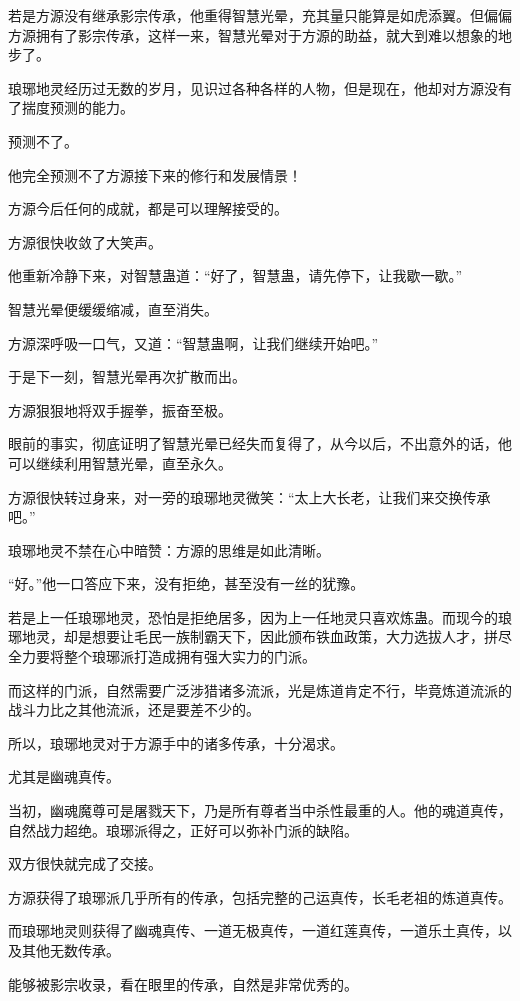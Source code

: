 \begin{this_body}
若是方源没有继承影宗传承，他重得智慧光晕，充其量只能算是如虎添翼。但偏偏方源拥有了影宗传承，这样一来，智慧光晕对于方源的助益，就大到难以想象的地步了。

琅琊地灵经历过无数的岁月，见识过各种各样的人物，但是现在，他却对方源没有了揣度预测的能力。

预测不了。

他完全预测不了方源接下来的修行和发展情景！

方源今后任何的成就，都是可以理解接受的。

方源很快收敛了大笑声。

他重新冷静下来，对智慧蛊道：“好了，智慧蛊，请先停下，让我歇一歇。”

智慧光晕便缓缓缩减，直至消失。

方源深呼吸一口气，又道：“智慧蛊啊，让我们继续开始吧。”

于是下一刻，智慧光晕再次扩散而出。

方源狠狠地将双手握拳，振奋至极。

眼前的事实，彻底证明了智慧光晕已经失而复得了，从今以后，不出意外的话，他可以继续利用智慧光晕，直至永久。

方源很快转过身来，对一旁的琅琊地灵微笑：“太上大长老，让我们来交换传承吧。”

琅琊地灵不禁在心中暗赞：方源的思维是如此清晰。

“好。”他一口答应下来，没有拒绝，甚至没有一丝的犹豫。

若是上一任琅琊地灵，恐怕是拒绝居多，因为上一任地灵只喜欢炼蛊。而现今的琅琊地灵，却是想要让毛民一族制霸天下，因此颁布铁血政策，大力选拔人才，拼尽全力要将整个琅琊派打造成拥有强大实力的门派。

而这样的门派，自然需要广泛涉猎诸多流派，光是炼道肯定不行，毕竟炼道流派的战斗力比之其他流派，还是要差不少的。

所以，琅琊地灵对于方源手中的诸多传承，十分渴求。

尤其是幽魂真传。

当初，幽魂魔尊可是屠戮天下，乃是所有尊者当中杀性最重的人。他的魂道真传，自然战力超绝。琅琊派得之，正好可以弥补门派的缺陷。

双方很快就完成了交接。

方源获得了琅琊派几乎所有的传承，包括完整的己运真传，长毛老祖的炼道真传。

而琅琊地灵则获得了幽魂真传、一道无极真传，一道红莲真传，一道乐土真传，以及其他无数传承。

能够被影宗收录，看在眼里的传承，自然是非常优秀的。


\end{this_body}
